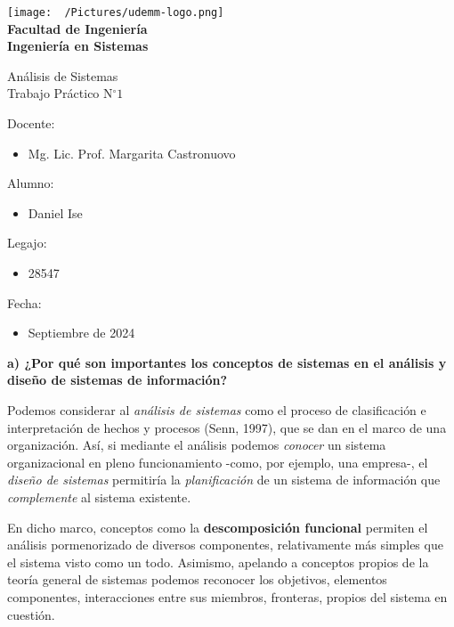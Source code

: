 \documentclass[12pt]{article}
\begin{document}
\thispagestyle{empty}

\begin{center}
  \vspace*{.5cm}
  \texttt{[image: ~/Pictures/udemm-logo.png]}\\
  \vspace{.2cm}
  \Large
  \textbf{Facultad de Ingeniería}\\
  \textbf{Ingeniería en Sistemas}\\
  \vspace{2cm}

  \Huge
  Análisis de Sistemas\\
  Trabajo Práctico N\(^{\circ} 1\)\\
  \vfill

  \raggedright
  \Large
  Docente:
  \begin{itemize}
    \item[] Mg. Lic. Prof. Margarita Castronuovo
  \end{itemize}
  Alumno:
  \begin{itemize}
    \item[] Daniel Ise
  \end{itemize}
  Legajo:
  \begin{itemize}
    \item[] 28547
  \end{itemize}
  Fecha:
  \begin{itemize}
    \item[] Septiembre de 2024
  \end{itemize}
\end{center}

\pagebreak

\textbf{a) ¿Por qué son importantes los conceptos de sistemas en el análisis
  y diseño de sistemas de información?}

Podemos considerar al \textit{análisis de sistemas} como el proceso de
clasificación e interpretación de hechos y procesos (Senn, 1997),
que se dan en el marco de una organización. Así,
si mediante el análisis podemos \textit{conocer} un sistema organizacional
en pleno funcionamiento -como, por ejemplo, una empresa-,
el \textit{diseño de sistemas} permitiría la \textit{planificación}
de un sistema de información que \textit{complemente} al sistema existente.

En dicho marco, conceptos como la \textbf{descomposición funcional}
permiten el análisis pormenorizado de diversos componentes,
relativamente más simples que el sistema visto como un todo.
Asimismo,
apelando a conceptos propios de la teoría general de sistemas
podemos reconocer los objetivos, elementos componentes,
interacciones entre sus miembros, fronteras, propios del sistema en cuestión.
\end{document}
